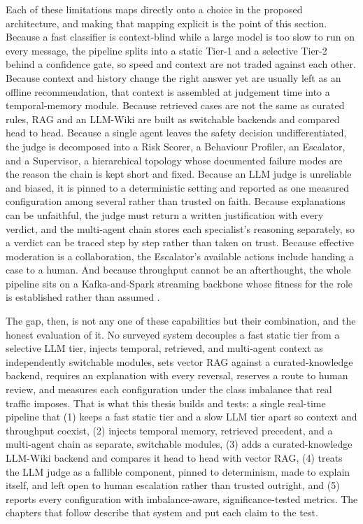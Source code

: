 Each of these limitations maps directly onto a choice in the proposed architecture, and making that mapping explicit is the point of this section. Because a fast classifier is context-blind while a large model is too slow to run on every message, the pipeline splits into a static Tier-1 and a selective Tier-2 behind a confidence gate, so speed and context are not traded against each other. Because context and history change the right answer yet are usually left as an offline recommendation, that context is assembled at judgement time into a temporal-memory module. Because retrieved cases are not the same as curated rules, RAG and an LLM-Wiki are built as switchable backends and compared head to head. Because a single agent leaves the safety decision undifferentiated, the judge is decomposed into a Risk Scorer, a Behaviour Profiler, an Escalator, and a Supervisor, a hierarchical topology whose documented failure modes are the reason the chain is kept short and fixed. Because an LLM judge is unreliable and biased, it is pinned to a deterministic setting and reported as one measured configuration among several rather than trusted on faith. Because explanations can be unfaithful, the judge must return a written justification with every verdict, and the multi-agent chain stores each specialist's reasoning separately, so a verdict can be traced step by step rather than taken on trust. Because effective moderation is a collaboration, the Escalator's available actions include handing a case to a human. And because throughput cannot be an afterthought, the whole pipeline sits on a Kafka-and-Spark streaming backbone whose fitness for the role is established rather than assumed \citep{kafkaeval2017}.

The gap, then, is not any one of these capabilities but their combination, and the honest evaluation of it. No surveyed system decouples a fast static tier from a selective LLM tier, injects temporal, retrieved, and multi-agent context as independently switchable modules, sets vector RAG against a curated-knowledge backend, requires an explanation with every reversal, reserves a route to human review, and measures each configuration under the class imbalance that real traffic imposes. That is what this thesis builds and tests: a single real-time pipeline that (1) keeps a fast static tier and a slow LLM tier apart so context and throughput coexist, (2) injects temporal memory, retrieved precedent, and a multi-agent chain as separate, switchable modules, (3) adds a curated-knowledge LLM-Wiki backend and compares it head to head with vector RAG, (4) treats the LLM judge as a fallible component, pinned to determinism, made to explain itself, and left open to human escalation rather than trusted outright, and (5) reports every configuration with imbalance-aware, significance-tested metrics. The chapters that follow describe that system and put each claim to the test.